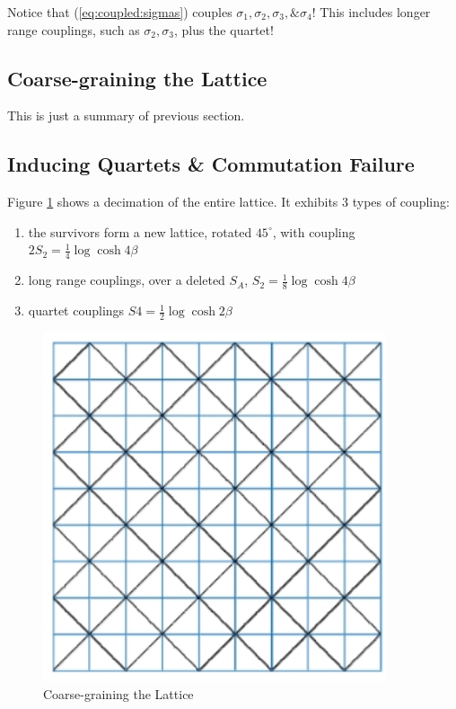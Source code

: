 \documentclass[]{article}
\begin{document}
Notice that (\ref{eq:coupled:sigmas}) couples $\sigma_1, \sigma_2, \sigma_3, \& \sigma_4$! This includes longer range couplings, such as $\sigma_2, \sigma_3$, plus the quartet!

\subsection{Coarse-graining the Lattice}

This is just a summary of previous section.

\subsection{Inducing Quartets \& Commutation Failure}

Figure \ref{fig:ising-decimation}\cite{aoki2014domain} shows a decimation of the entire lattice. It exhibits 3 types of coupling:

\begin{enumerate}
	\item the survivors form a new lattice, rotated $45^\circ$, with coupling $2S_2=\frac{1}{4} \log{\cosh{4 \beta}}$\label{item:coupling1}
	\item long range couplings, over a deleted $S_A$,  $S_2=\frac{1}{8} \log{\cosh{4 \beta}}$\label{item:coupling2}
	\item quartet couplings $S4=\frac{1}{2} \log{\cosh{2\beta}}$\label{item:coupling3}
\end{enumerate}

\begin{figure}[H]
	\caption{Coarse-graining the Lattice}\label{fig:ising-decimation}
	\includegraphics[width=0.9\textwidth]{isinng-decimation}
\end{figure}
\end{document}
